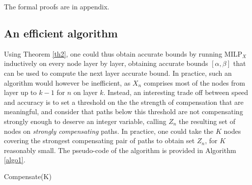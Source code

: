 \documentclass{llncs}
\begin{document}
The formal proofs are in appendix.


\subsection{An efficient algorithm}

Using Theorem \ref{th2}, one could thus obtain accurate bounds by running MILP$_{X}$ inductively on every node layer by layer, obtaining accurate bounds $[\alpha,\beta]$ that can be used to compute the next layer accurate bound. In practice, such an algorithm would however be inefficient, as $X_n$ comprises most of the nodes from layer up to $k-1$ for $n$ on layer $k$. Instead, an interesting trade off between speed and accuracy is to set a threshold on the the strength of compensation that are meaningful, and consider that paths below this threshold are not compensating strongly enough to deserve an integer variable, calling $Z_n$ the resulting set of nodes on {\em strongly compensating} paths. In practice, one could take the $K$ nodes covering the strongest compensating pair of paths to obtain set $Z_n$, for $K$ reasonably small. The pseudo-code of the algorithm is provided in Algorithm \ref{algo1}.


\begin{algorithm}[b!]
	\caption{Compensate(K)}
	\label{algo1}
	
	
\end{algorithm}	
\end{document}
